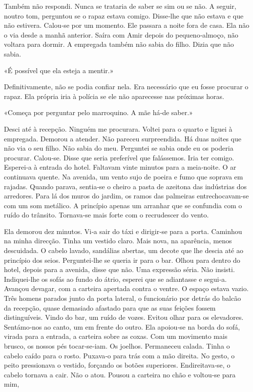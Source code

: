 Também não respondi. Nunca se trataria de saber se sim ou se não. A
seguir, noutro tom, perguntou se o rapaz estava comigo. Disse­‑lhe que
não estava e que não estivera. Calou­‑se por um momento. Ele passara a
noite fora de casa. Ela não o via desde a manhã anterior. Saíra com Amir
depois do pequeno­‑almoço, não voltara para dormir. A empregada também
não sabia do filho. Dizia que não sabia.

«É possível que ela esteja a mentir.»

Definitivamente, não se podia confiar nela. Era necessário que eu fosse
procurar o rapaz. Ela própria iria à polícia se ele não aparecesse nas
próximas horas.

«Começa por perguntar pelo marroquino. A mãe há­‑de saber.»

Desci até à recepção. Ninguém me procurara. Voltei para o quarto e
liguei à empregada. Demorou a atender. Não pareceu surpreendida. Há duas
noites que não via o seu filho. Não sabia do meu. Perguntei se sabia
onde eu os poderia procurar. Calou­‑se. Disse que seria preferível que
falássemos. Iria ter comigo. Esperei­‑a à entrada do hotel. Faltavam
vinte minutos para a meia­‑noite. O ar continuava quente. Na avenida, um
vento sujo de poeira e fumo que soprava em rajadas. Quando parava,
sentia­‑se o cheiro a pasta de azeitona das indústrias dos arredores.
Para lá dos muros do jardim, os ramos das palmeiras entrechocavam­‑se
com um som metálico. A princípio apenas um arranhar que se confundia com
o ruído do trânsito. Tornava­‑se mais forte com o recrudescer do vento.

Ela demorou dez minutos. Vi­‑a sair do táxi e dirigir­‑se para a porta.
Caminhou na minha direcção. Tinha um vestido claro. Mais nova, na
aparência, menos descuidada. O cabelo lavado, sandálias abertas, um
decote que lhe descia até ao princípio dos seios. Perguntei­‑lhe se
queria ir para o bar. Olhou para dentro do hotel, depois para a avenida,
disse que não. Uma expressão séria. Não insisti. Indiquei­‑lhe os sofás
ao fundo do átrio, esperei que se adiantasse e segui­‑a. Avançou
devagar, com a carteira apertada contra o ventre. O espaço estava vazio.
Três homens parados junto da porta lateral, o funcionário por detrás do
balcão da recepção, quase demasiado afastado para que as suas feições
fossem distinguíveis. Vindo do bar, um ruído de vozes. Evitou olhar para
os elevadores. Sentámo­‑nos ao canto, um em frente do outro. Ela
apoiou­‑se na borda do sofá, virada para a entrada, a carteira sobre as
coxas. Com um movimento mais brusco, os nossos pés tocar­‑se­‑iam. Os
joelhos. Permaneceu calada. Tinha o cabelo caído para o rosto. Puxava­‑o
para trás com a mão direita. No gesto, o peito pressionava o vestido,
forçando os botões superiores. Endireitava­‑se, o cabelo tornava a cair.
Não o atou. Pousou a carteira no chão e voltou­‑se para mim,

